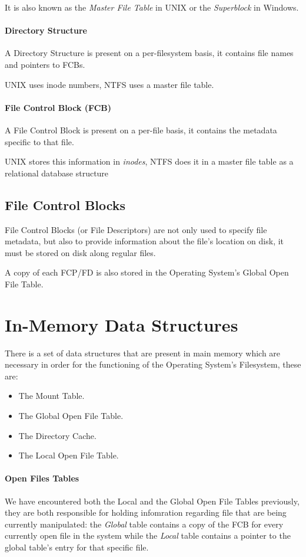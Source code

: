 \documentclass[openright, twoside]{report}
\theoremstyle{definition}
\theoremstyle{example}
\begin{document}
It is also known as the \emph{Master File Table} in UNIX or the \emph{Superblock} in Windows.

\paragraph{Directory Structure}
A Directory Structure is present on a per-filesystem basis, it contains file names and 
pointers to FCBs.

UNIX uses inode numbers, NTFS uses a master file table.

\paragraph{File Control Block (FCB)}
A File Control Block is present on a per-file basis, it contains the metadata specific 
to that file.

UNIX stores this information in \emph{inodes}, NTFS does it in a master file table as a 
relational database structure

\subsection{File Control Blocks}
File Control Blocks (or File Descriptors) are not only used to specify file metadata, but also to provide 
information about the file's location on disk, it must be stored on disk along regular files.

A copy of each FCP/FD is also stored in the Operating System's Global Open File Table.

\section{In-Memory Data Structures}
There is a set of data structures that are present in main memory which are 
necessary in order for the functioning of the Operating System's Filesystem, 
these are:

\begin{multicols}{2}
	\begin{itemize}
		\item The Mount Table.
		\item The Global Open File Table.
		\item The Directory Cache.
		\item The Local Open File Table.
	\end{itemize}
\end{multicols}

\paragraph{Open Files Tables}
We have encountered both the Local and the Global Open File Tables previously, 
they are both responsible for holding infomration regarding file that are being 
currently manipulated: the \emph{Global} table contains a copy of the FCB 
for every currently open file in the system while the \emph{Local} table contains a
pointer to the global table's entry for that specific file.
\end{document}
